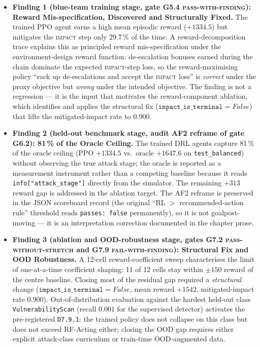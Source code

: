 \begin{itemize}
    \item \textbf{Finding 1 (blue-team training stage, gate G5.4 \textsc{pass-with-finding}): Reward Mis-specification, Discovered and Structurally Fixed.} The trained PPO agent earns a high mean episodic reward ($+1334.5$) but mitigates the \textsc{impact} step only $29.7\,\%$ of the time. A reward-decomposition trace explains this as principled reward mis-specification under the environment-design reward function: de-escalation bonuses earned during the chain dominate the expected \textsc{impact}-step loss, so the reward-maximising policy ``rack up de-escalations and accept the \textsc{impact} loss'' is \emph{correct} under the proxy objective but \emph{wrong} under the intended objective. The finding is not a regression --- it is the input that motivates the reward-component ablation, which identifies and applies the structural fix ($\texttt{impact\_is\_terminal}=\mathit{False}$) that lifts the mitigated-impact rate to $0.900$.

    \item \textbf{Finding 2 (held-out benchmark stage, audit AF2 reframe of gate G6.2): 81\,\% of the Oracle Ceiling.} The trained DRL agents capture 81\,\% of the oracle ceiling (PPO $+1334.5$ vs.\ oracle $+1647.6$ on \texttt{test\_balanced}) without observing the true attack stage; the oracle is reported as a measurement instrument rather than a competing baseline because it reads \texttt{info["attack\_stage"]} directly from the simulator. The remaining $+313$ reward gap is addressed in the ablation target. The AF2 reframe is preserved in the JSON scoreboard record (the original ``RL $>$ recommended-action rule'' threshold reads \texttt{passes: false} permanently), so it is not goalpost-moving --- it is an interpretation correction documented in the chapter prose.

    \item \textbf{Finding 3 (ablation and OOD-robustness stage, gates G7.2 \textsc{pass-without-stretch} and G7.9 \textsc{fail-with-finding}): Structural Fix and OOD Robustness.} A 12-cell reward-coefficient sweep characterises the limit of one-at-a-time coefficient shaping: 11 of 12 cells stay within $\pm 150$ reward of the centre baseline. Closing most of the residual gap required a \emph{structural} change ($\texttt{impact\_is\_terminal}=\mathit{False}$, mean reward $+1542$, mitigated-impact rate $0.900$). Out-of-distribution evaluation against the hardest held-out class \texttt{VulnerabilityScan} (recall $0.001$ for the supervised detector) activates the pre-registered \texttt{D7.9.1}: the trained policy does not collapse on this class but does not exceed RF-Acting either; closing the OOD gap requires either explicit attack-class curriculum or train-time OOD-augmented data.
\end{itemize}

